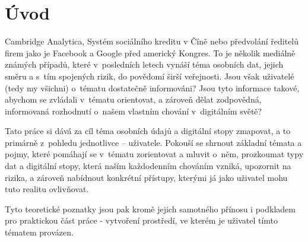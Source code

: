 \chapter*{Úvod}
\pagestyle{plain}

Cambridge Analytica, Systém sociálního kreditu v Číně nebo předvolání ředitelů firem jako je Facebook a Google před americký Kongres. To je několik mediálně známých případů, které v~posledních letech vynáší téma osobních dat, jejich směru a s~tím spojených rizik, do povědomí širší veřejnosti.
Jsou však uživatelé (tedy my všichni) o~tématu dostatečně informováni? Jsou tyto informace takové, abychom se zvládali v~tématu orientovat, a zároveň dělat zodpovědná, informovaná rozhodnutí o~našem vlastním chování v~digitálním světě?

Tato práce si dává za cíl téma osobních údajů a digitální stopy zmapovat, a to primárně z~pohledu jednotlivce -- uživatele. Pokouší se shrnout základní témata a pojmy, které pomáhají se v~tématu zorientovat a mluvit o~něm, prozkoumat typy dat a digitální stopy, která naším každodenním chováním vzniká, upozornit na rizika, a zároveň nabídnout konkrétní přístupy, kterými já jako uživatel 
mohu tuto realitu ovlivňovat.

Tyto teoretické poznatky jsou pak kromě jejich samotného přínosu i podkladem pro praktickou část práce - vytvoření prostředí, ve kterém je uživatel tímto tématem provázen. 
